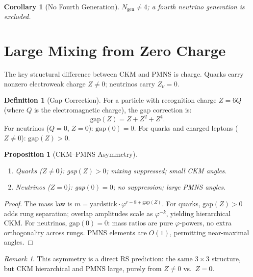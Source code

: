 \documentclass[12pt,a4paper]{article}
\newtheorem{corollary}[theorem]{Corollary}
\newtheorem{proposition}[theorem]{Proposition}
\theoremstyle{definition}
\newtheorem{definition}[theorem]{Definition}
\theoremstyle{remark}
\newtheorem{remark}[theorem]{Remark}
\begin{document}
\begin{corollary}[No Fourth Generation]
\label{cor:no4gen}
$N_{\mathrm{gen}} \neq 4$; a fourth neutrino generation is excluded.
\end{corollary}

\section{Large Mixing from Zero Charge}
\label{sec:large-mixing}

The key structural difference between CKM and PMNS is charge.  Quarks
carry nonzero electroweak charge $Z \neq 0$; neutrinos carry
$Z_\nu = 0$.

\begin{definition}[Gap Correction]
\label{def:gap}
For a particle with recognition charge $Z = 6Q$ (where $Q$ is the
electromagnetic charge), the gap correction is:
\begin{equation}
  \mathrm{gap}(Z) = Z + Z^2 + Z^4.
\end{equation}
For neutrinos ($Q = 0$, $Z = 0$): $\mathrm{gap}(0) = 0$.
For quarks and charged leptons ($Z \neq 0$): $\mathrm{gap}(Z) > 0$.
\end{definition}

\begin{proposition}[CKM--PMNS Asymmetry]
\label{thm:asymmetry}
\begin{enumerate}[label=(\roman*)]
  \item Quarks ($Z \neq 0$): gap$(Z) > 0$; mixing
    suppressed; small CKM angles.
  \item Neutrinos ($Z = 0$): gap$(0) = 0$; no
    suppression; large PMNS angles.
\end{enumerate}
\end{proposition}

\begin{proof}
The mass law is $m = \mathrm{yardstick} \cdot
\varphi^{r - 8 + \mathrm{gap}(Z)}$.  For quarks, $\mathrm{gap}(Z) > 0$
adds rung separation; overlap amplitudes scale as $\varphi^{-k}$,
yielding hierarchical CKM.  For neutrinos, $\mathrm{gap}(0) = 0$:
mass ratios are pure $\varphi$-powers, no extra orthogonality across
rungs.  PMNS elements are $O(1)$, permitting near-maximal angles.
\end{proof}

\begin{remark}
This asymmetry is a direct RS prediction: the same $3 \times 3$
structure, but CKM hierarchical and PMNS large, purely from
$Z \neq 0$ vs.\ $Z = 0$.
\end{remark}
\end{document}
